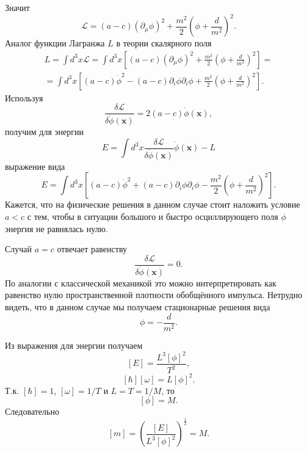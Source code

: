 \documentclass[a4paper]{article}
\begin{document}
\begin{sol}
Значит
\[
	\mathcal{L}=(a-c)( \partial_\mu \phi)^2
+\frac{m^2}{2} \left(\phi+\frac{d}{m^2}\right)^2
.\] 
Аналог функции Лагранжа $L$  в теории скалярного поля
\begin{multline*}
	L= \int d^3 x \mathcal{L}= \int d^3 x \left[(a-c)( \partial_\mu \phi)^2
+\frac{m^2}{2} \left(\phi+\frac{d}{m^2}\right)^2
  \right] =\\=
  \int d^3 x \left[ 
  (a-c) \dot{\phi}^2-(a-c)\partial_i \phi \partial_i \phi
+\frac{m^2}{2} \left(\phi+\frac{d}{m^2}\right)^2
  \right] 
.\end{multline*} 
Используя
\[
	\frac{\delta \mathcal{L}}{\delta \dot{\phi}(\mathbf{x})}=
	2(a-c)\dot{\phi}(\mathbf{x}),
\]
получим для энергии
\[
	E= \int d^3 x  \frac{\delta \mathcal{L}}{\delta \dot{\phi}
	(\mathbf{x})}\dot{\phi}(\mathbf{x})-L
\]
выражение  вида
\[
E=\int d^3 x \left[ 
  (a-c) \dot{\phi}^2+(a-c)\partial_i \phi \partial_i \phi
-\frac{m^2}{2} \left(\phi+\frac{d}{m^2}\right)^2
\right] 
.\] 
Кажется, что на физические решения в данном случае стоит наложить условие
$a<c$ с тем, чтобы в ситуации большого и быстро осциллирующего поля  $\phi$
энергия не равнялась нулю.

Случай $a=c$ отвечает равенству
\[
	\frac{\delta \mathcal{L}}{\delta \dot{\phi}(\mathbf{x})}=0
.\]
По аналогии с классической механикой это можно интерпретировать как
равенство нулю пространственной плотности обобщённого импульса.
Нетрудно видеть, что в данном случае мы получаем стационарные решения
вида
\[
\phi=-\frac{d}{m^2}
.\] 
\end{sol}
\begin{sol}
Из выражения для энергии получаем
\[
	[E]=\frac{L^3 [\phi]^2}{T^2}
,\]
\[
	[\hbar][\omega]=L[\phi]^2
.\] 
Т.к. $[\hbar]=1$, $[\omega]=1 /T$ и  $L=T=1 /M$, то
 \[
	 [\phi]=M
.\] 
Следовательно
\[
	[m]=\left( \frac{[E]}{L^3 [\phi]^2} \right) ^\frac{1}{2}=M
.\] 
\end{sol}
\end{document}
